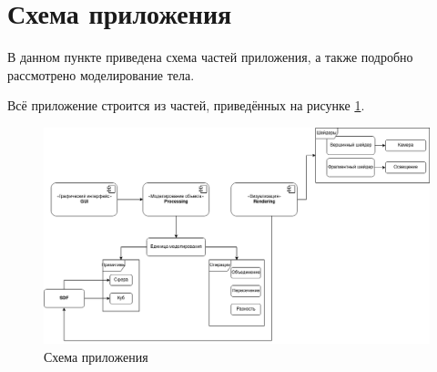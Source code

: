 


\section{Схема приложения}
В данном пункте приведена схема частей приложения, а также подробно рассмотрено моделирование тела.

Всё приложение строится из частей, приведённых на рисунке \ref{fig:app_scheme}.

\begin{figure}[H]
  \centering
  \includegraphics[scale=0.4]{inc/img/component_diagram}
  \caption{Схема приложения}
  \label{fig:app_scheme}
\end{figure}

